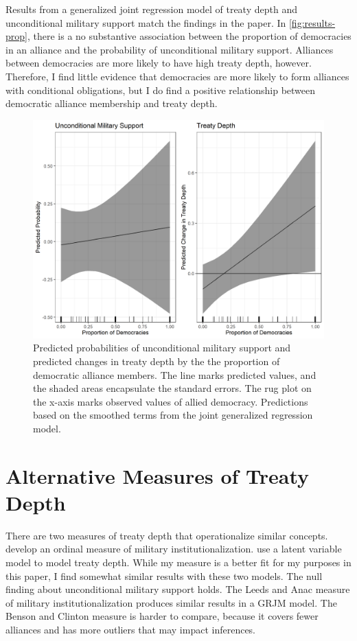 \documentclass[12pt]{article}
\begin{document}
Results from a generalized joint regression model of treaty depth and unconditional military support match the findings in the paper.
In \autoref{fig:results-prop}, there is a no substantive association between the proportion of democracies in an alliance and the probability of unconditional military support. 
Alliances between democracies are more likely to have high treaty depth, however. 
Therefore, I find little evidence that democracies are more likely to form alliances with conditional obligations, but I do find a positive relationship between democratic alliance membership and treaty depth. 


\begin{figure}
\includegraphics[width=.95\textwidth]{results-prop.png}  
\caption{Predicted probabilities of unconditional military support and predicted changes in treaty depth by the the proportion of democratic alliance members. The line marks predicted values, and the shaded areas encapsulate the standard errors. The rug plot on the x-axis marks observed values of allied democracy. Predictions based on the smoothed terms from the joint generalized regression model.}
\label{fig:results-prop}
\end{figure}





\section{Alternative Measures of Treaty Depth}


There are two measures of treaty depth that operationalize similar concepts. 
\citet{LeedsAnac2005} develop an ordinal measure of military institutionalization.
\citet{BensonClinton2016} use a latent variable model to model treaty depth. 
While my measure is a better fit for my purposes in this paper, I find somewhat similar results with these two models. 
The null finding about unconditional military support holds. 
The Leeds and Anac measure of military institutionalization produces similar results in a GRJM model. 
The Benson and Clinton measure is harder to compare, because it covers fewer alliances and has more outliers that may impact inferences.
\end{document}
